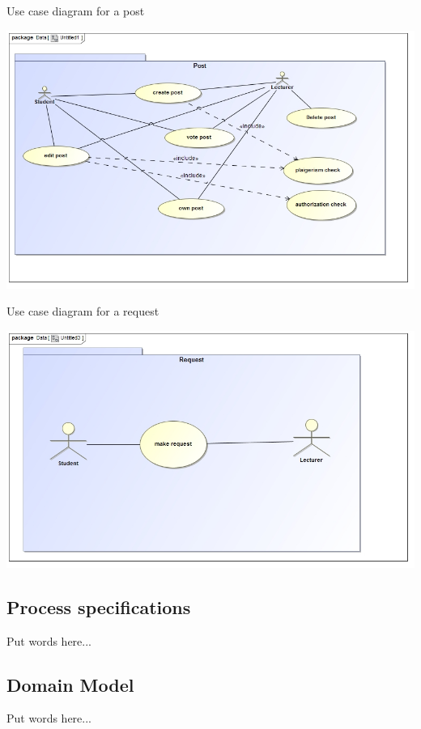 \documentclass[12pt, oneside]{article}
\begin{document}
		Use case diagram for a post
		
			 \includegraphics[scale=1]{post}
			 
		Use case diagram for a request
		
			 \includegraphics[scale=1]{request1}
			 
	\subsection{Process specifications}
		Put words here...
	\subsection{ Domain Model}
		Put words here...
\end{document}
